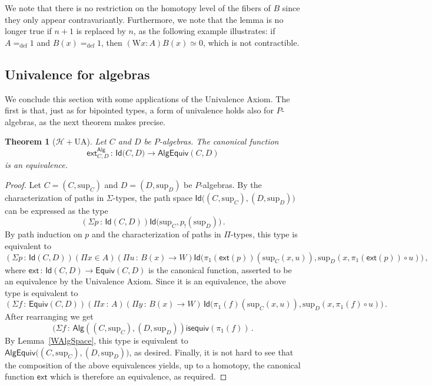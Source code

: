 \documentclass[10pt,a4paper,oneside,reqno]{amsart}
\numberwithin{equation}{section}
\theoremstyle{mythm}
\newtheorem{theorem}{Theorem}[subsection]
\theoremstyle{mydef}
\theoremstyle{myrmk}
\newcommand{\defeq}{=_{\mathrm{def}}}
\newcommand{\co}{\,{:}\,}
\newcommand{\Hint}{\mathcal{H}}
\newcommand{\UA}{\mathrm{UA}}
\newcommand{\isequiv}{\mathsf{isequiv}}
\newcommand{\ext}{\mathsf{ext}}
\newcommand{\Id}{\mathsf{Id}}
\newcommand{\W}{\mathrm{W}}
\newcommand{\Palg}{\mathsf{Alg}}
\renewcommand{\sup}{\mathrm{sup}}
\newcommand{\AlgEquiv}{\mathsf{AlgEquiv}}
\begin{document}
We note that there is no restriction on the homotopy level of the fibers of $B$ since they only appear contravariantly. Furthermore, we note that the lemma is no longer true if $n+1$ is replaced by $n$, as the following example
illustrates: if $A \defeq 1$ and $B(x) \defeq 1$, then $(\W x:A) B(x) \simeq 0$, which is not contractible. 


\subsection{Univalence for algebras} \label{sec:univalencealgebras}
We conclude this section with some applications of the Univalence Axiom. The first is that, just as for bipointed 
types, a form of univalence holds also for $P$-algebras, as the next theorem makes precise. 


\begin{theorem}[$\Hint + \UA$] \label{thm:Punivalence}
Let $C$ and $D$ be $P$-algebras. The canonical function
\[ 
\ext^\Palg_{C,D} \co \Id \big(C,D\big) \to  \AlgEquiv(C,D) 
\]
is an equivalence.
\end{theorem}

\begin{proof} 
Let $C = (C,\sup_C)$ and $D= (D,\sup_D)$ be $P$-algebras. By the characterization of paths in $\Sigma$-types, the path space 
$\Id \big( (C,\sup_C) ,  (D,\sup_D) \big)$ can be expressed as the type
\[
(\Sigma p \co \Id(C, D)) \Id \big( \sup_C ,  p_{!}(\sup_D)  \big) \, .
\]
By path induction on $p$ and the characterization of paths in $\Pi$-types, this type is equivalent to
\[  
(\Sigma p \co \Id(C,D))
(\Pi x \in A) 
(\Pi u \co B(x) \to W)
\Id \big(  \pi_1(\ext(p))( \sup_C(x,u)),  \sup_D(x, \pi_1(\ext (p)) \circ u) \big) \, , 
\]
where $\ext \co \Id(C,D) \to \mathsf{Equiv}(C,D)$ is the canonical function, asserted to be an equivalence by the Univalence Axiom. Since it is an equivalence, the above type is equivalent to
\[
(\Sigma f \co \mathsf{Equiv}(C,D)) 
(\Pi x  \co A) 
(\Pi y \co B(x) \to W) \, 
\Id \big( \pi_1(f) (\sup_C(x,u))  , \sup_D (x, \pi_1(f) \circ u) \big) \, .
\]
After rearranging we get
\[
(\Sigma f \co \Palg ( (C,\sup_C),  (D,\sup_D) ) \isequiv(\pi_1(f)) \, .
\]
By Lemma~\ref{WAlgSpace}, this type is equivalent to $\AlgEquiv \big( (C,\sup_C),  (D,\sup_D)\big)$, as desired. Finally, it is not hard to see that the composition of the above equivalences yields, up to a homotopy, the canonical function $\ext$ which is therefore an equivalence, as required.
\end{proof} 
\end{document}
